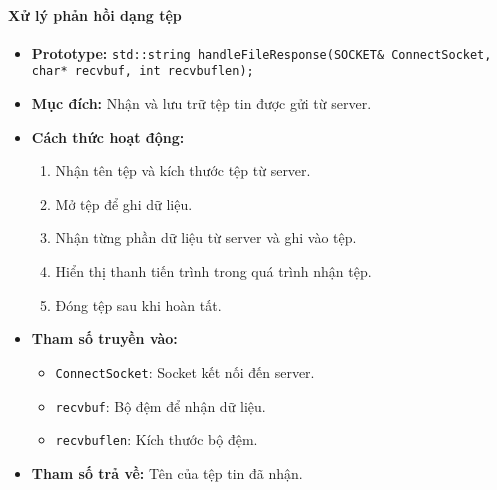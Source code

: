 \paragraph{\textbf{Xử lý phản hồi dạng tệp}}
\begin{itemize}
    \item \textbf{Prototype:} \texttt{std::string handleFileResponse(SOCKET\& ConnectSocket, char* recvbuf, int recvbuflen);}
    
    \item \textbf{Mục đích:} Nhận và lưu trữ tệp tin được gửi từ server.
    
    \item \textbf{Cách thức hoạt động:} 
    \begin{enumerate}
        \item Nhận tên tệp và kích thước tệp từ server.
        \item Mở tệp để ghi dữ liệu.
        \item Nhận từng phần dữ liệu từ server và ghi vào tệp.
        \item Hiển thị thanh tiến trình trong quá trình nhận tệp.
        \item Đóng tệp sau khi hoàn tất.
    \end{enumerate}
    
    \item \textbf{Tham số truyền vào:} 
    \begin{itemize}
        \item \texttt{ConnectSocket}: Socket kết nối đến server.
        \item \texttt{recvbuf}: Bộ đệm để nhận dữ liệu.
        \item \texttt{recvbuflen}: Kích thước bộ đệm.
    \end{itemize}
    
    \item \textbf{Tham số trả về:} Tên của tệp tin đã nhận.
\end{itemize}

